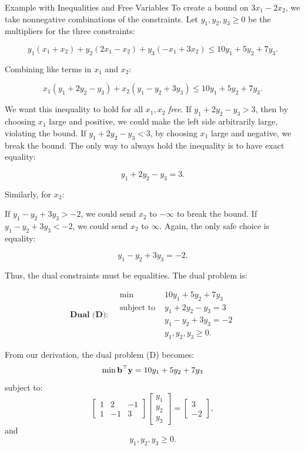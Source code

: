\begin{example}{Example with Inequalities and Free Variables}{}
To create a bound on $3x_1 - 2x_2$, we take nonnegative combinations of the constraints. Let $y_1, y_2, y_3 \geq 0$ be the multipliers for the three constraints:

\[
y_1(x_1 + x_2) + y_2(2x_1 - x_2) + y_3(-x_1 + 3x_2) \leq 10y_1 + 5y_2 + 7y_3.
\]

Combining like terms in $x_1$ and $x_2$:

\[
x_1(y_1 + 2y_2 - y_3) + x_2(y_1 - y_2 + 3y_3) \leq 10y_1 + 5y_2 + 7y_3.
\]

We want this inequality to hold for all $x_1, x_2$ \emph{free}. If $y_1 + 2y_2 - y_3 > 3$, then by choosing $x_1$ large and positive, we could make the left side arbitrarily large, violating the bound. If $y_1 + 2y_2 - y_3 < 3$, by choosing $x_1$ large and negative, we break the bound. The only way to always hold the inequality is to have exact equality:

\[
y_1 + 2y_2 - y_3 = 3.
\]

Similarly, for $x_2$:

If $y_1 - y_2 + 3y_3 > -2$, we could send $x_2$ to $-\infty$ to break the bound. If $y_1 - y_2 + 3y_3 < -2$, we could send $x_2$ to $\infty$. Again, the only safe choice is equality:

\[
y_1 - y_2 + 3y_3 = -2.
\]

Thus, the dual constraints must be equalities. The dual problem is:

\[
\textbf{Dual (D):} \quad
\begin{aligned}
\min \; & 10y_1 + 5y_2 + 7y_3 \\
\text{subject to } & y_1 + 2y_2 - y_3 = 3 \\
& y_1 - y_2 + 3y_3 = -2 \\
& y_1, y_2, y_3 \geq 0.
\end{aligned}
\]

From our derivation, the dual problem (D) becomes:
\[
\min \mathbf{b}^\top \mathbf{y} = 10y_1 + 5y_2 + 7y_3
\]
subject to:
\[
\begin{bmatrix}
1 & 2 & -1 \\
1 & -1 & 3
\end{bmatrix}
\begin{bmatrix}
y_1 \\ y_2 \\ y_3
\end{bmatrix}
=
\begin{bmatrix}
3 \\ -2
\end{bmatrix},
\]
and
\[
y_1, y_2, y_3 \geq 0.
\]


\end{example}
